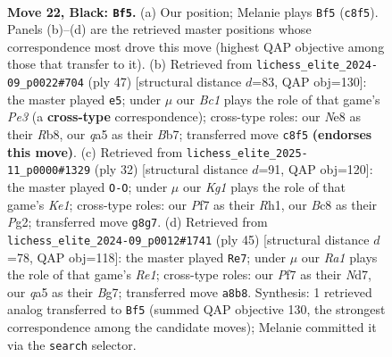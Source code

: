 \documentclass[11pt]{article}
\begin{document}
\clearpage

\begin{figure}[p]\centering
\begin{subfigure}{0.46\textwidth}\centering
\resizebox{\linewidth}{!}{%
\newchessgame
\chessboard[
  setfen={r1brn1k1/p1p1qp2/6p1/Q1PpP2p/3N4/1P2P1P1/p2B1P1P/3KRBR1 b - - 2 22},
  showmover=false,
  pgfstyle=straightmove, color=movearrow, markmove={c8-f5}
]}
\caption{}
\end{subfigure}\hfill
\begin{subfigure}{0.46\textwidth}\centering
\resizebox{\linewidth}{!}{%
\newchessgame
\chessboard[
  setfen={1r2r3/1b1q1pbk/1p1pp1pn/7p/2PpP3/P2P2PP/1QN2PB1/1RB2RK1 b - - 9 24},
  showmover=false,
  pgfstyle=straightmove, color=movearrow, markmove={e6-e5}
]}
\caption{}
\end{subfigure}
\\[4pt]
\begin{subfigure}{0.46\textwidth}\centering
\resizebox{\linewidth}{!}{%
\newchessgame
\chessboard[
  setfen={2kr1b1r/pp1np1pp/8/q1pP1p2/P3pB1P/2P1Q3/2P1NPP1/R3K2R w KQ - 0 17},
  showmover=false,
  pgfstyle=straightmove, color=movearrow, markmove={e1-g1}
]}
\caption{}
\end{subfigure}\hfill
\begin{subfigure}{0.46\textwidth}\centering
\resizebox{\linewidth}{!}{%
\newchessgame
\chessboard[
  setfen={2r1r1k1/2qn1pbp/pp1pp1p1/8/P1PP1Q2/1P1B1R1P/1B3PP1/3R2K1 b - - 2 23},
  showmover=false,
  pgfstyle=straightmove, color=movearrow, markmove={e8-e7}
]}
\caption{}
\end{subfigure}
\caption{\textbf{Move 22, Black: \texttt{Bf5}.} (a) Our position; Melanie plays \texttt{Bf5} (\texttt{c8f5}). Panels (b)--(d) are the retrieved master positions whose correspondence most drove this move (highest QAP objective among those that transfer to it). (b) Retrieved from \texttt{lichess\_elite\_2024-09\_p0022\#704} (ply 47) [structural distance $d$=83, QAP obj=130]: the master played \texttt{e5}; under $\mu$ our \emph{Bc1} plays the role of that game's \emph{Pe3} (a \textbf{cross-type} correspondence); cross-type roles: our \emph{N}e8 as their \emph{R}b8, our \emph{q}a5 as their \emph{B}b7; transferred move \texttt{c8f5} \textbf{(endorses this move)}. (c) Retrieved from \texttt{lichess\_elite\_2025-11\_p0000\#1329} (ply 32) [structural distance $d$=91, QAP obj=120]: the master played \texttt{O-O}; under $\mu$ our \emph{Kg1} plays the role of that game's \emph{Ke1}; cross-type roles: our \emph{P}f7 as their \emph{R}h1, our \emph{B}c8 as their \emph{P}g2; transferred move \texttt{g8g7}. (d) Retrieved from \texttt{lichess\_elite\_2024-09\_p0012\#1741} (ply 45) [structural distance $d$=78, QAP obj=118]: the master played \texttt{Re7}; under $\mu$ our \emph{Ra1} plays the role of that game's \emph{Re1}; cross-type roles: our \emph{P}f7 as their \emph{N}d7, our \emph{q}a5 as their \emph{B}g7; transferred move \texttt{a8b8}. Synthesis: 1 retrieved analog transferred to \texttt{Bf5} (summed QAP objective 130, the strongest correspondence among the candidate moves); Melanie committed it via the \texttt{search} selector.}
\label{fig:thought-m43}
\end{figure}
\end{document}
